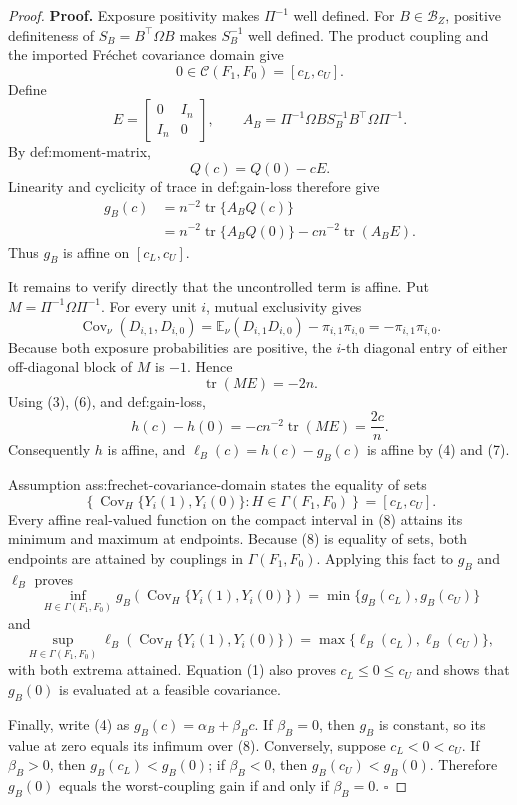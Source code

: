 \documentclass{article}
\begin{document}
\begin{proof}
\textbf{Proof.}
Exposure positivity makes \(\Pi^{-1}\) well defined.  For \(B\in\mathcal B_Z\), positive definiteness of \(S_B=B^{\top}\Omega B\) makes \(S_B^{-1}\) well defined.  The product coupling and the imported Fr\'echet covariance domain give
\[
0\in\mathcal C(F_1,F_0)=[c_L,c_U].
\tag{1}
\]
Define
\[
E=\begin{bmatrix}0&I_n\\ I_n&0\end{bmatrix},
\qquad
A_B=\Pi^{-1}\Omega B S_B^{-1}B^{\top}\Omega\Pi^{-1}.
\tag{2}
\]
By def:moment-matrix,
\[
Q(c)=Q(0)-cE.
\tag{3}
\]
Linearity and cyclicity of trace in def:gain-loss therefore give
\[
\begin{aligned}
g_B(c)
&=n^{-2}\operatorname{tr}\{A_BQ(c)\}\\
&=n^{-2}\operatorname{tr}\{A_BQ(0)\}
-c n^{-2}\operatorname{tr}(A_BE).
\end{aligned}
\tag{4}
\]
Thus \(g_B\) is affine on \([c_L,c_U]\).

It remains to verify directly that the uncontrolled term is affine.  Put \(M=\Pi^{-1}\Omega\Pi^{-1}\).  For every unit \(i\), mutual exclusivity gives
\[
\operatorname{Cov}_{\nu}(D_{i,1},D_{i,0})
=\mathbb E_{\nu}(D_{i,1}D_{i,0})-\pi_{i,1}\pi_{i,0}
=-\pi_{i,1}\pi_{i,0}.
\tag{5}
\]
Because both exposure probabilities are positive, the \(i\)-th diagonal entry of either off-diagonal block of \(M\) is \(-1\).  Hence
\[
\operatorname{tr}(ME)=-2n.
\tag{6}
\]
Using (3), (6), and def:gain-loss,
\[
h(c)-h(0)
=-c n^{-2}\operatorname{tr}(ME)
=\frac{2c}{n}.
\tag{7}
\]
Consequently \(h\) is affine, and \(\ell_B(c)=h(c)-g_B(c)\) is affine by (4) and (7).

Assumption ass:frechet-covariance-domain states the equality of sets
\[
\left\{\operatorname{Cov}_H\{Y_i(1),Y_i(0)\}:
H\in\Gamma(F_1,F_0)\right\}=[c_L,c_U].
\tag{8}
\]
Every affine real-valued function on the compact interval in (8) attains its minimum and maximum at endpoints.  Because (8) is equality of sets, both endpoints are attained by couplings in \(\Gamma(F_1,F_0)\).  Applying this fact to \(g_B\) and \(\ell_B\) proves
\[
\inf_{H\in\Gamma(F_1,F_0)}
g_B\!\left(\operatorname{Cov}_H\{Y_i(1),Y_i(0)\}\right)
=\min\{g_B(c_L),g_B(c_U)\}
\tag{9}
\]
and
\[
\sup_{H\in\Gamma(F_1,F_0)}
\ell_B\!\left(\operatorname{Cov}_H\{Y_i(1),Y_i(0)\}\right)
=\max\{\ell_B(c_L),\ell_B(c_U)\},
\tag{10}
\]
with both extrema attained.  Equation (1) also proves \(c_L\le0\le c_U\) and shows that \(g_B(0)\) is evaluated at a feasible covariance.

Finally, write (4) as \(g_B(c)=\alpha_B+\beta_Bc\).  If \(\beta_B=0\), then \(g_B\) is constant, so its value at zero equals its infimum over (8).  Conversely, suppose \(c_L<0<c_U\).  If \(\beta_B>0\), then \(g_B(c_L)<g_B(0)\); if \(\beta_B<0\), then \(g_B(c_U)<g_B(0)\).  Therefore \(g_B(0)\) equals the worst-coupling gain if and only if \(\beta_B=0\).  \(\square\)
\end{proof}
\end{document}
